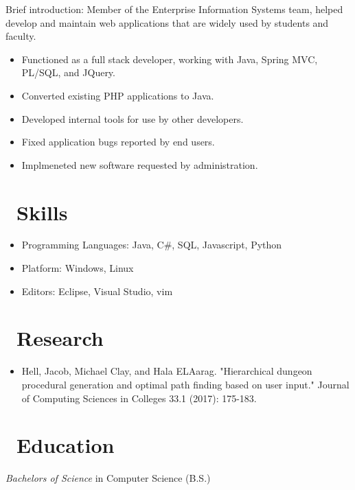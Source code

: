 \documentclass{resume}
\begin{document}

Brief introduction: Member of the Enterprise Information Systems team, helped develop and maintain web applications that are widely used by students and faculty.
\begin{itemize}
  \item Functioned as a full stack developer, working with Java, Spring MVC, PL/SQL, and JQuery.
  \item Converted existing PHP applications to Java.
  \item Developed internal tools for use by other developers.
  \item Fixed application bugs reported by end users.
  \item Implmeneted new software requested by administration.
\end{itemize}

\section{\faCogs\ Skills}
\begin{itemize}[parsep=0.5ex]
  \item Programming Languages: Java, C\#, SQL, Javascript, Python
  \item Platform: Windows, Linux
  \item Editors: Eclipse, Visual Studio, vim
\end{itemize}

\section{\faFlask\ Research}
\begin{itemize}[parsep=0.5ex]
\item Hell, Jacob, Michael Clay, and Hala ELAarag. "Hierarchical dungeon procedural generation and optimal path finding based on user input." Journal of Computing Sciences in Colleges 33.1 (2017): 175-183.
\end{itemize}
\section{\faGraduationCap\ Education}
\textit{Bachelors of Science} in Computer Science (B.S.)
\end{document}
